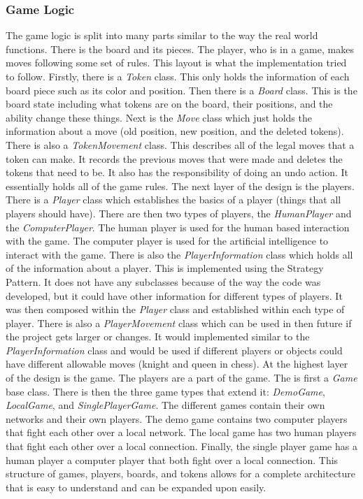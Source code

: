 \documentclass{article}
\begin{document}
\subsubsection{Game Logic}
	The game logic is split into many parts similar to the way the real world functions. There is the board and its pieces. The player, who is in a game, makes moves following some set of rules. This layout is what the implementation tried to follow.
	Firstly, there is a \textit{Token} class. This only holds the information of each board piece such as its color and position. Then there is a \textit{Board} class. This is the board state including what tokens are on the board, their positions, and the ability change these things. Next is the \textit{Move} class which just holds the information about a move (old position, new position, and the deleted tokens). There is also a \textit{TokenMovement} class. This describes all of the legal moves that a token can make. It records the previous moves that were made and deletes the tokens that need to be. It also has the responsibility of doing an undo action. It essentially holds all of the game rules. 
	The next layer of the design is the players. There is a \textit{Player} class which establishes the basics of a player (things that all players should have). There are then two types of players, the \textit{HumanPlayer} and the \textit{ComputerPlayer}. The human player is used for the human based interaction with the game. The computer player is used for the artificial intelligence to interact with the game. There is also the \textit{PlayerInformation} class which holds all of the information about a player. This is implemented using the Strategy Pattern. It does not have any subclasses because of the way the code was developed, but it could have other information for different types of players. It was then composed within the \textit{Player} class and established within each type of player. There is also a \textit{PlayerMovement} class which can be used in then future if the project gets larger or changes. It would implemented similar to the \textit{PlayerInformation} class and would be used if different players or objects could have different allowable moves (knight and queen in chess).
	At the highest layer of the design is the game. The players are a part of the game. The is first a \textit{Game} base class. There is then the three game types that extend it: \textit{DemoGame}, \textit{LocalGame}, and \textit{SinglePlayerGame}. The different games contain their own networks and their own players. The demo game contains two computer players that fight each other over a local network. The local game has two human players that fight each other over a local connection. Finally, the single player game has a human player a computer player that both fight over a local connection. This structure of games, players, boards, and tokens allows for a complete architecture that is easy to understand and can be expanded upon easily. 
\end{document}
